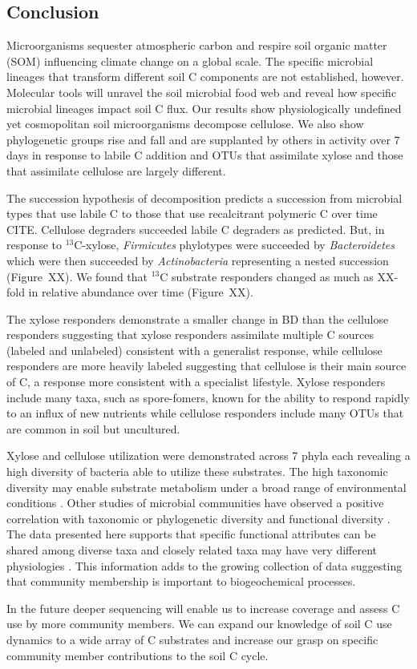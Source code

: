 \subsection{Conclusion} 
Microorganisms sequester atmospheric carbon and respire soil organic matter
(SOM) influencing climate change on a global scale. The specific microbial
lineages that transform different soil C components are not established,
however. Molecular tools will unravel the soil microbial food web and reveal
how specific microbial lineages impact soil C flux. Our results show
physiologically undefined yet cosmopolitan soil microorganisms decompose
cellulose. We also show phylogenetic groups rise and fall and are supplanted by
others in activity over 7 days in response to labile C addition and OTUs that
assimilate xylose and those that assimilate cellulose are largely different. 

The succession hypothesis of decomposition predicts a succession from
microbial types that use labile C to those that use recalcitrant polymeric
C over time CITE. Cellulose degraders succeeded labile C degraders as
predicted. But, in response to $^{13}$C-xylose, \textit{Firmicutes}
phylotypes were succeeded by \textit{Bacteroidetes} which were then
succeeded by \textit{Actinobacteria} representing a nested succession
(Figure~XX). We found that $^{13}$C substrate responders changed as much as
XX-fold in relative abundance over time (Figure~XX). 

The xylose responders demonstrate a smaller change in BD than the
cellulose responders suggesting that xylose responders assimilate multiple C
sources (labeled and unlabeled) consistent with a generalist response, while
cellulose responders are more heavily labeled suggesting that cellulose is
their main source of C, a response more consistent with a specialist lifestyle.
Xylose responders include many taxa, such as spore-fomers, known for the
ability to respond rapidly to an influx of new nutrients while cellulose
responders include many OTUs that are common in soil but uncultured.
 
Xylose and cellulose utilization were demonstrated across 7 phyla each
revealing a high diversity of bacteria able to utilize these substrates. The
high taxonomic diversity may enable substrate metabolism under a broad range of
environmental conditions \citep{Goldfarb_2011}. Other studies of microbial
communities have observed a positive correlation with taxonomic or phylogenetic
diversity and functional diversity
\citep{Fierer_2012,Fierer_2013,Philippot_2010,Tringe_2005,Gilbert_2010,Bryant_2012}.
The data presented here supports that specific functional attributes can be
shared among diverse taxa and closely related taxa may have very different
physiologies \citep{Fierer_2012,Philippot_2010}. This information adds to the
growing collection of data suggesting that community membership is important to
biogeochemical processes.

In the future deeper sequencing will enable us to increase coverage and assess
C use by more community members. We can expand our knowledge
of soil C use dynamics to a wide array of C substrates and increase our grasp
on specific community member contributions to the soil C cycle.
